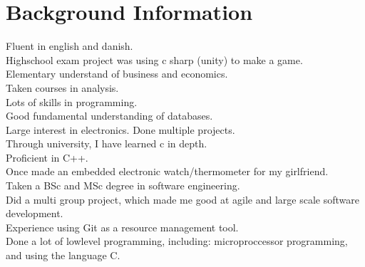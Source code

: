 \section*{Background Information}
Fluent in english and danish.\\Highschool exam project was using c sharp (unity) to make a game.\\Elementary understand of business and economics.\\Taken courses in analysis.\\Lots of skills in programming.\\Good fundamental understanding of databases.\\Large interest in electronics. Done multiple projects.\\Through university, I have learned c in depth.\\Proficient in C++.\\Once made an embedded electronic watch/thermometer for my girlfriend.\\Taken a BSc and MSc degree in software engineering.\\Did a multi group project, which made me good at agile and large scale software development.\\Experience using Git as a resource management tool.\\Done a lot of lowlevel programming, including: microproccessor programming, and using the language C.\\
